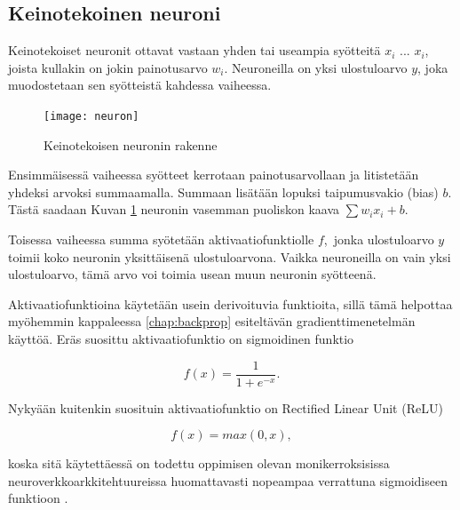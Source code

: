 \documentclass[finnish]{tktltiki2}
\theoremstyle{definition}
\theoremstyle{remark}
\begin{document}
  \subsection{Keinotekoinen neuroni}
    \label{chap:artificial-neuron}

    Keinotekoiset neuronit ottavat vastaan yhden tai useampia syötteitä $x_i$ ... $x_i$, joista kullakin on jokin painotusarvo $w_i$. Neuroneilla on yksi ulostuloarvo $y$, joka muodostetaan sen syötteistä kahdessa vaiheessa.

    \begin{figure}[h]
      \centering
      \texttt{[image: neuron]}
      \caption{Keinotekoisen neuronin rakenne}
      \label{pic:neuron}
    \end{figure}


    Ensimmäisessä vaiheessa syötteet kerrotaan painotusarvollaan ja litistetään yhdeksi arvoksi summaamalla. Summaan lisätään lopuksi taipumusvakio (bias) $b$. Tästä saadaan Kuvan \ref{pic:neuron} neuronin vasemman puoliskon kaava $\sum w_i x_i + b$.

    Toisessa vaiheessa summa syötetään aktivaatiofunktiolle $f$, jonka ulostuloarvo $y$ toimii koko neuronin yksittäisenä ulostuloarvona. Vaikka neuroneilla on vain yksi ulostuloarvo, tämä arvo voi toimia usean muun neuronin syötteenä.

    Aktivaatiofunktioina käytetään usein derivoituvia funktioita, sillä tämä helpottaa myöhemmin kappaleessa \ref{chap:backprop} esiteltävän gradienttimenetelmän käyttöä. Eräs suosittu aktivaatiofunktio on sigmoidinen funktio

    \begin{equation}
      f(x) = \frac{1}{1 + e^{-x}}.
      \label{eq:sigmoid-func}
    \end{equation}

    \noindent Nykyään kuitenkin suosituin aktivaatiofunktio on Rectified Linear Unit (ReLU)

    \begin{equation}
      f(x) = max(0, x),
      \label{eq:relu-func}
    \end{equation}

    \noindent koska sitä käytettäessä on todettu oppimisen olevan monikerroksisissa neuroverkkoarkkitehtuureissa huomattavasti nopeampaa verrattuna sigmoidiseen funktioon \cite{nature-lecun15}.
\end{document}
